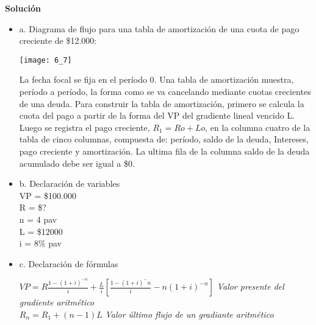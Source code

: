 \begin{itemize}
		\textbf{Solución}\\
		\begin{itemize}
			\item a. Diagrama de flujo para una tabla de amortización de una cuota de pago creciente de \$12.000:\\
			\begin{center}
				\texttt{[image: 6\_7]}
			\end{center}
			La fecha focal se fija en el período 0.
            Una tabla de amortización  muestra, período a período, la forma como se va cancelando mediante cuotas crecientes de una deuda. Para construir la tabla de amortización, primero se calcula la cuota del pago a partir de la forma del VP del gradiente lineal vencido L. Luego se registra el pago creciente, $R_{1} = Ro+Lo$, en la columna cuatro de la tabla de cinco columnas, compuesta de: período, saldo de la deuda, Intereses, pago creciente y amortización. La ultima fila de la columna saldo de la deuda acumulado debe ser igual a \$0.\\

			\item b. Declaración de variables\\
			VP = \$100.000\\
			R = \$?\\
			n = 4 pav\\
			L = \$12000\\
			i = 8\% pav\\
			\item c. Declaración de fórmulas
			
			\vspace{2mm}
			
			$VP = R	\frac{1-(1+i)^{-n}}{i}+\frac{L}{i}[\frac{1-(1+i)^-{n}}{i}- n(1+i)^{-n}]$ \hspace{5 pt} \textit{Valor presente del gradiente aritmético}\\
			$R_{n} = R_{1} + (n-1)L$\hspace{10 pt} \textit{Valor último flujo de un gradiante aritmético}\\
			
			\clearpage
			

\end{itemize}
\end{itemize}

